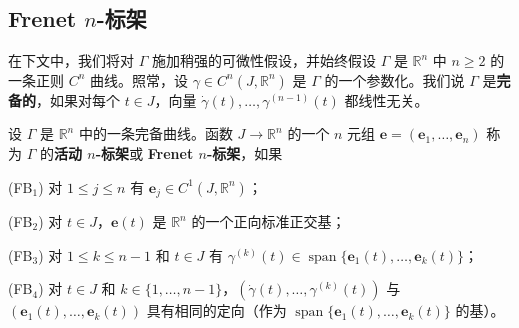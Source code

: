 \subsection*{Frenet $ n $-标架}

在下文中，我们将对 $ \Gamma $ 施加稍强的可微性假设，并始终假设 $ \Gamma $ 是 $ \mathbb{R}^n $ 中 $ n \ge 2 $ 的一条正则 $ C^n $ 曲线。照常，设 $ \gamma \in C^n(J, \mathbb{R}^n) $ 是 $ \Gamma $ 的一个参数化。我们说 $ \Gamma $ 是\textbf{完备的}，如果对每个 $ t \in J $，向量 $ \dot\gamma(t), \ldots, \gamma^{(n-1)}(t) $ 都线性无关。

设 $ \Gamma $ 是 $ \mathbb{R}^n $ 中的一条完备曲线。函数 $ J \to \mathbb{R}^n $ 的一个 $ n $ 元组 $ \mathbf{e} = (\mathbf{e}_1, \ldots, \mathbf{e}_n) $ 称为 $ \Gamma $ 的\textbf{活动 $ n $-标架}或 \textbf{Frenet $ n $-标架}，如果

(FB$ {}_{1} $) 对 $ 1 \le j \le n $ 有 $ \mathbf{e}_j \in C^1(J, \mathbb{R}^n) $；

(FB$ {}_{2} $) 对 $ t \in J $，$ \mathbf{e}(t) $ 是 $ \mathbb{R}^n $ 的一个正向标准正交基；

(FB$ {}_{3} $) 对 $ 1 \le k \le n - 1 $ 和 $ t \in J $ 有 $ \gamma^{(k)}(t) \in \operatorname{span}\{\mathbf{e}_1(t), \ldots, \mathbf{e}_k(t)\} $；

(FB$ {}_{4} $) 对 $ t \in J $ 和 $ k \in \{1, \ldots, n - 1\} $，$ (\dot\gamma(t), \ldots, \gamma^{(k)}(t)) $ 与 $ (\mathbf{e}_1(t), \ldots, \mathbf{e}_k(t)) $ 具有相同的定向（作为 $ \operatorname{span}\{\mathbf{e}_1(t), \ldots, \mathbf{e}_k(t)\} $ 的基）。

